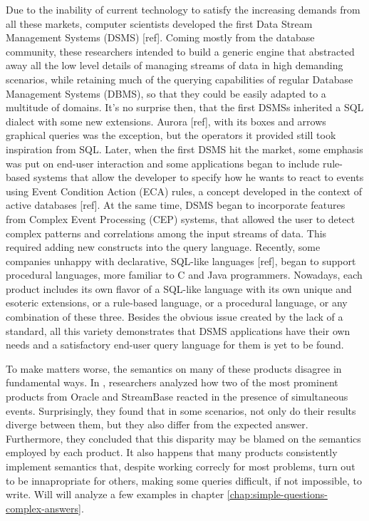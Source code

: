 \documentclass{report}
\begin{document}
Due to the inability of current technology to satisfy the increasing
demands from all these markets, computer scientists developed the
first Data Stream Management Systems (DSMS) [ref]. Coming mostly from
the database community, these researchers intended to build a generic
engine that abstracted away all the low level details of managing
streams of data in high demanding scenarios, while retaining much of
the querying capabilities of regular Database Management Systems
(DBMS), so that they could be easily adapted to a multitude of
domains. It's no surprise then, that the first DSMSs inherited a SQL
dialect with some new extensions. Aurora [ref], with its boxes and
arrows graphical queries was the exception, but the operators it
provided still took inspiration from SQL. Later, when the first DSMS
hit the market, some emphasis was put on end-user interaction and some
applications began to include rule-based systems that allow the
developer to specify how he wants to react to events using Event
Condition Action (ECA) rules, a concept developed in the context of
active databases [ref]. At the same time, DSMS began to incorporate
features from Complex Event Processing (CEP) systems, that allowed the
user to detect complex patterns and correlations among the input
streams of data. This required adding new constructs into the query
language. Recently, some companies unhappy with declarative, SQL-like
languages [ref], began to support procedural languages, more familiar
to C and Java programmers. Nowadays, each product includes its own
flavor of a SQL-like language with its own unique and esoteric
extensions, or a rule-based language, or a procedural language, or any
combination of these three. Besides the obvious issue created by the
lack of a standard, all this variety demonstrates that DSMS
applications have their own needs and a satisfactory end-user query
language for them is yet to be found.

To make matters worse, the semantics on many of these products
disagree in fundamental ways. In \cite{towards_stream_sql_standard},
researchers analyzed how two of the most prominent products from
Oracle and StreamBase reacted in the presence of simultaneous
events. Surprisingly, they found that in some scenarios, not only do
their results diverge between them, but they also differ from the
expected answer. Furthermore, they concluded that this disparity may
be blamed on the semantics employed by each product. It also happens
that many products consistently implement semantics that, despite
working correcly for most problems, turn out to be innapropriate for
others, making some queries difficult, if not impossible, to
write. Will will analyze a few examples in chapter
\ref{chap:simple-questions-complex-answers}.
\end{document}
